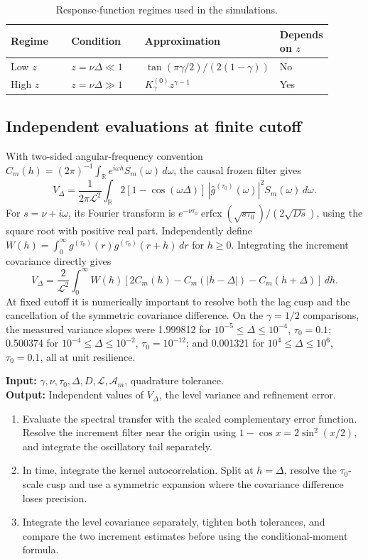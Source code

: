 \documentclass[11pt]{article}
\newcommand{\Liq}{\mathcal L}
\begin{document}
\begin{table}[ht]
\centering
\small
\caption{Response-function regimes used in the simulations.}
\label{tab:response-regimes}
\begin{tabular}{p{0.19\linewidth}p{0.23\linewidth}p{0.37\linewidth}p{0.11\linewidth}}
\toprule
Regime & Condition & Approximation & Depends on \(z\) \\
\midrule
Low \(z\) & \(z=\nu\Delta\ll1\) &
\(\tan(\pi\gamma/2)/(2(1-\gamma))\) & No \\
High \(z\) & \(z=\nu\Delta\gg1\) &
\(K_\gamma^{(0)}z^{\gamma-1}\) & Yes \\
\bottomrule
\end{tabular}
\end{table}

\subsection{Independent evaluations at finite cutoff}
With two-sided angular-frequency convention
\(C_m(h)=(2\pi)^{-1}\int_{\mathbb R}e^{i\omega h}S_m(\omega)\,d\omega\),
the causal frozen filter gives
\[
 V_\Delta=\frac{1}{2\pi\Liq^2}\int_{\mathbb R}
 2[1-\cos(\omega\Delta)]\,|\widehat g^{(\tau_0)}(\omega)|^2
 S_m(\omega)\,d\omega .
\]
For \(s=\nu+i\omega\), its Fourier transform is
\(e^{-\nu\tau_0}\operatorname{erfcx}(\sqrt{s\tau_0})/(2\sqrt{Ds})\),
using the square root with positive real part. Independently define
\(W(h)=\int_0^\infty g^{(\tau_0)}(r)g^{(\tau_0)}(r+h)\,dr\) for \(h\ge0\).
Integrating the increment covariance directly gives
\[
 V_\Delta=\frac{2}{\Liq^2}\int_0^\infty W(h)
 [2C_m(h)-C_m(|h-\Delta|)-C_m(h+\Delta)]\,dh .
\]
At fixed cutoff it is numerically important to resolve both the lag cusp
and the cancellation of the symmetric covariance difference. On the
\(\gamma=1/2\) comparisons, the measured variance slopes were 1.999812
for \(10^{-5}\le\Delta\le10^{-4}\), \(\tau_0=0.1\); 0.500374 for
\(10^{-4}\le\Delta\le10^{-2}\), \(\tau_0=10^{-12}\); and 0.001321 for
\(10^4\le\Delta\le10^6\), \(\tau_0=0.1\), all at unit resilience.
\begin{algorithm}[htbp]
\caption{Stationary frozen increment variance at finite resolution}
\small\textbf{Input:} \(\gamma,\nu,\tau_0,\Delta,D,\Liq,\mathcal A_m\), quadrature tolerance.\\
\textbf{Output:} Independent values of \(V_\Delta\), the level variance and refinement error.
\begin{enumerate}\setlength{\itemsep}{0.1em}
\item Evaluate the spectral transfer with the scaled complementary error function. Resolve the increment filter near the origin using \(1-\cos x=2\sin^2(x/2)\), and integrate the oscillatory tail separately.
\item In time, integrate the kernel autocorrelation. Split at \(h=\Delta\), resolve the \(\tau_0\)-scale cusp and use a symmetric expansion where the covariance difference loses precision.
\item Integrate the level covariance separately, tighten both tolerances, and compare the two increment estimates before using the conditional-moment formula.
\end{enumerate}
\end{algorithm}
\end{document}
